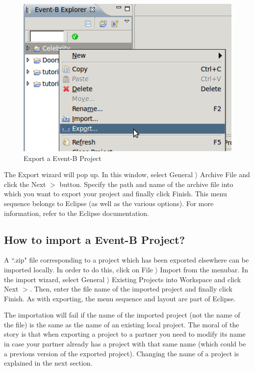 \begin{figure}[!h]
\begin{center}
	\includegraphics{img/faq/faq_exportproject.png}
	\caption{Export a Event-B Project}
	\label{fig_faq_exportproject}
\end{center}
\end{figure}

The Export wizard will pop up. In this window, select \textsf{General $\rangle$ Archive File} and click the \textsf{Next $>$} button. Specify the path and name of the archive file into which you want to export your project and finally click \textsf{Finish}. This menu sequence belongs to Eclipse (as well as the various options). For more information, refer to the Eclipse documentation. 

\subsection{How to import a Event-B Project?}

A ``.zip" file corresponding to a project which has been exported elsewhere can be imported locally. In order to do this, click on \textsf{File $\rangle$ Import} from the menubar. In the import wizard, select \textsf{General $\rangle$ Existing Projects into Workspace} and click \textsf{Next $>$}. Then, enter the file name of the imported project and finally click \textsf{Finish}. As with exporting, the menu sequence and layout are part of Eclipse.

The importation will fail if the name of the imported project (not the name of the file) is the same as the name of an existing local project. The moral of the story is that when exporting a project to a partner you need to modify its name in case your partner already has a project with that same name (which could be a previous version of the exported project). Changing the name of a project is explained in the next section. 

